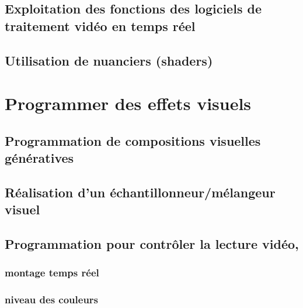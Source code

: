 \documentclass[
]{book}
\begin{document}
\hypertarget{exploitation-des-fonctions-des-logiciels-de-traitement-viduxe9o-en-temps-ruxe9el}{%
\section{Exploitation des fonctions des logiciels de traitement vidéo en temps réel}\label{exploitation-des-fonctions-des-logiciels-de-traitement-viduxe9o-en-temps-ruxe9el}}

\hypertarget{utilisation-de-nuanciers-shaders}{%
\section{Utilisation de nuanciers (shaders)}\label{utilisation-de-nuanciers-shaders}}

\hypertarget{programmer}{%
\chapter{Programmer des effets visuels}\label{programmer}}

\hypertarget{programmation-de-compositions-visuelles-guxe9nuxe9ratives}{%
\section{Programmation de compositions visuelles génératives}\label{programmation-de-compositions-visuelles-guxe9nuxe9ratives}}

\hypertarget{ruxe9alisation-dun-uxe9chantillonneurmuxe9langeur-visuel}{%
\section{Réalisation d'un échantillonneur/mélangeur visuel}\label{ruxe9alisation-dun-uxe9chantillonneurmuxe9langeur-visuel}}

\hypertarget{programmation-pour-contruxf4ler-la-lecture-viduxe9o}{%
\section{Programmation pour contrôler la lecture vidéo,}\label{programmation-pour-contruxf4ler-la-lecture-viduxe9o}}

\hypertarget{montage-temps-ruxe9el}{%
\subsection{montage temps réel}\label{montage-temps-ruxe9el}}

\hypertarget{niveau-des-couleurs}{%
\subsection{niveau des couleurs}\label{niveau-des-couleurs}}
\end{document}
